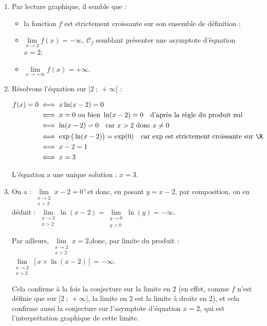 
\begin{enumerate}
	\item Par lecture graphique, il semble que :
	\begin{itemize}
		\item la fonction $f$ est strictement croissante sur son ensemble de définition ;
		\item $\lim\limits_{x \to 2} f(x) = -\infty$, $\mathcal{C}_f$ semblant présenter une asymptote d'équation $x = 2$;
		\item $\lim\limits_{x \to +\infty} f(x) = +\infty$.
	\end{itemize}

	\item Résolvons l'équation sur $]2~;~+\infty[$ :

$\begin{aligned}
		f(x) = 0&\iff x\ln(x- 2) = 0\\
		& \iff x = 0 \text{ ou bien } \ln(x-2) = 0\quad \text{d'après la règle du produit nul}\\
		& \iff \ln(x-2) = 0\quad \text{car } x > 2\text{ donc } x\neq 0\\
		& \iff \exp\big(\ln(x-2)\big) = \exp(0)\quad \text{car exp est strictement croissante sur }\R\\
		& \iff x-2 = 1\\
		&\iff x = 3
\end{aligned}$

	L'équation a une unique solution : $x = 3$.

	\item On a : \quad $\lim\limits_{\substack{x \to 2\\x > 2}} x - 2 = 0^{+}$\quad et donc, en posant $y = x - 2$, par composition, on en déduit :
	 $\lim\limits_{\substack{x \to 2\\x > 2}} \ln(x - 2) = \lim\limits_{\substack{y \to 0\\y > 0}} \ln(y) = -\infty$.

Par ailleurs, \quad $\lim\limits_{\substack{x \to 2\\x > 2}} x = 2$,\quad donc, par limite du produit : \quad $\lim\limits_{\substack{x \to 2\\x > 2}}[ x\times \ln(x-2)] = -\infty $.

Cela confirme à la fois la conjecture sur la limite en 2 (en effet, comme $f$ n'est définie que sur $]2~;~+\infty]$, la limite en 2 est la limite à droite en 2), et cela confirme aussi la conjecture sur l'asymptote d'équation $x = 2$, qui est l'interprétation graphique de cette limite.


\end{enumerate}

